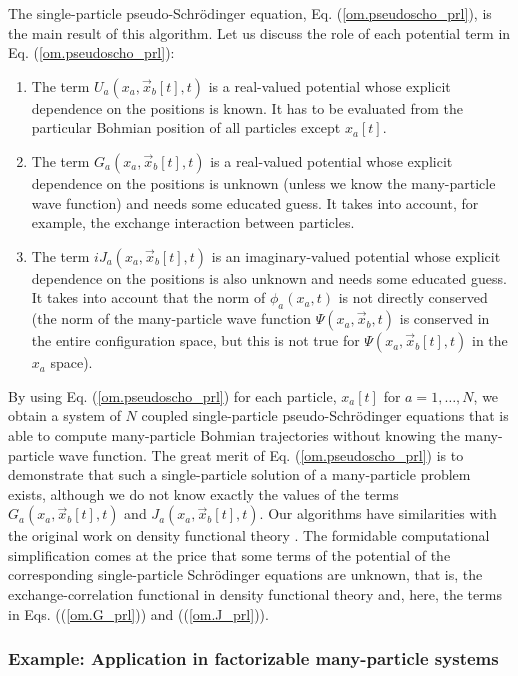 \documentclass[onecolumn,nofootinbib, secnumarabic, amsmath, nobibnotes,12pt,aps,pra]{revtex4-1}
\newcommand{\pref}[1]{(\ref{#1})}
\newcommand{\eref}[1]{Eq. (\ref{#1})}
\begin{document}
The single-particle pseudo-Schr\"odinger equation,
\eref{om.pseudoscho_prl}, is the main result of this algorithm. Let
us discuss the role of each potential term in
\eref{om.pseudoscho_prl}:
\begin{enumerate}
\item The term \textit{$U_{a}(x_{a},\vec x_{b}[t],t)$} is a real-valued potential whose explicit dependence on the positions is known. It has to be evaluated from the particular Bohmian position of all particles except $x_a[t]$.

\item The term \textit{$G_{a}(x_{a},\vec x_{b}[t],t)$} is a real-valued potential whose explicit dependence on the positions is unknown (unless we know the many-particle wave function) and needs some educated guess. It takes into account, for example, the exchange interaction between particles.

\item The term \textit{$i J_{a}(x_{a},\vec x_{b}[t],t)$} is an imaginary-valued potential whose explicit dependence on the positions is also unknown and needs some educated guess. It takes into account that the norm of $\phi_{a}(x_{a},t)$ is not directly conserved (the norm of the many-particle wave function $\Psi(x_a,\vec x_b,t)$ is conserved in the entire configuration space, but this is not true for $\Psi(x_a,\vec x_b[t],t)$ in the $x_a$ space).
\end{enumerate}

By using \eref{om.pseudoscho_prl} for each particle, $x_a[t]$ for $a = 1,\ldots,N$, we obtain a  system of $N$ coupled single-particle pseudo-Schr\"odinger equations that is able to compute many-particle Bohmian trajectories without knowing the many-particle wave function. The great merit of \eref{om.pseudoscho_prl} is to demonstrate that such a single-particle solution of a many-particle problem exists, although we do not know exactly the values of the terms $G_{a}(x_{a}, \vec x_{b}[t],t)$ and $J_{a}(x_{a},\vec x_{b}[t],t)$. Our algorithms have similarities with the original work on density functional theory \cite{om.kohn1964,om.kohn1965}. The formidable computational simplification comes at the price that some terms of the potential of the corresponding single-particle Schr\"odinger equations are unknown, that is, the exchange-correlation functional in density functional theory \cite{om.kohn1964,om.kohn1965} and, here, the terms in Eqs. (\pref{om.G_prl}) and (\pref{om.J_prl}).

\subsubsection{Example: Application in factorizable many-particle systems}
\end{document}
